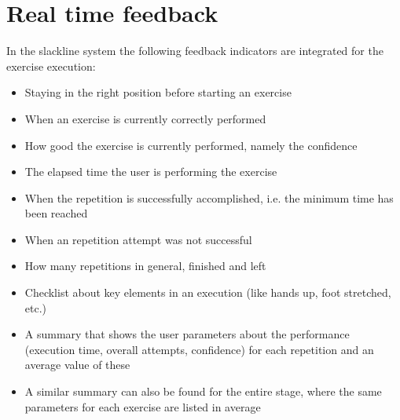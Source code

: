 \section{Real time feedback}

 In the slackline system the following feedback indicators are integrated for the exercise execution:
\begin{itemize}
\item Staying in the right position before starting an exercise
\item When an exercise is currently correctly performed
\item How good the exercise is currently performed, namely the confidence
\item The elapsed time the user is performing the exercise
\item When the repetition is successfully accomplished, i.e. the minimum time has been reached
\item When an repetition attempt was not successful
\item How many repetitions in general, finished and left
\item Checklist about key elements in an execution (like hands up, foot stretched, etc.)
\item A summary that shows the user parameters about the performance (execution time, overall attempts, confidence) for each repetition and an average value of these
\item A similar summary can also be found for the entire stage, where the same parameters for each exercise are listed in average
\end{itemize}

